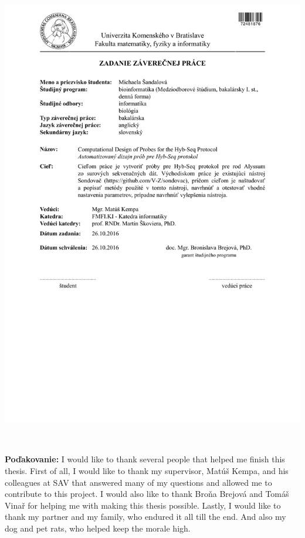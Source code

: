 \documentclass[12pt, oneside]{book}
\begin{document}
\newpage 
\thispagestyle{empty}
\hspace{-2cm}\includegraphics[width=1.1\textwidth]{images/zadanie_sandalova.pdf}


\frontmatter

\setcounter{page}{3}
\newpage 
~

\vfill
{\bf Poďakovanie:} I would like to thank several people that helped me finish this thesis. 
First of all, I would like to thank my supervisor, Matúš Kempa, and his colleagues at SAV that 
answered many of my questions and allowed me to contribute to this project. 
I would also like to thank Broňa Brejová and Tomáš Vinař for helping me with making this thesis possible. 
Lastly, I would like to thank my partner and my family, who endured it all till the end. And also my dog and 
pet rats, who helped keep the morale high. 
\end{document}
